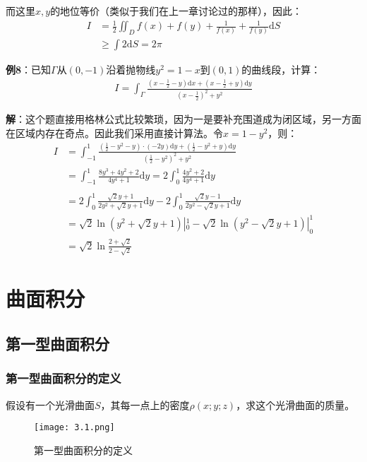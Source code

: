 \documentclass{ctexart}
\let\oldtextbf\textbf
\renewcommand{\textbf}[1]{\textcolor{brown!50!red}{\oldtextbf{#1}}}
\begin{document}
而这里$x,y$的地位等价（类似于我们在上一章讨论过的那样），因此：
\begin{align*}
    I&=\frac{1}{2}\iint_D f(x)+f(y)+\frac{1}{f(x)}+\frac{1}{f(y)}\mathrm{d}S\\
    &\geq \int 2\mathrm{d}S=2\pi
\end{align*}

\textbf{例8}：已知$\Gamma$从$(0,-1)$沿着抛物线$y^2=1-x$到$(0,1)$的曲线段，计算：
\begin{align*}
    I=\int_\Gamma \frac{(x-\frac{1}{2}-y)\mathrm{d}x+(x-\frac{1}{2}+y)\mathrm{d}y}{(x-\frac{1}{2})^2+y^2}
\end{align*}

\textbf{解}：这个题直接用格林公式比较繁琐，因为一是要补充围道成为闭区域，另一方面在区域内存在奇点。因此我们采用直接计算法。令$x=1-y^2$，则：
\begin{align*}
    I&=\int_{-1}^1\frac{(\frac{1}{2}-y^2-y)\cdot(-2y)\mathrm{d}y+(\frac{1}{2}-y^2+y)\mathrm{d}y}{(\frac{1}{2}
-y^2)^2+y^2 }\\
&=\int_{-1}^1 \frac{8y^3+4y^2+2}{4y^4+1}\mathrm{d}y=2\int_0^1\frac{4y^2+2}{4y^4+1}\mathrm{d}y\\
\\&=2\int_0^1\frac{\sqrt{2}y+1}{2y^2+\sqrt{2}y+1 }\mathrm{d}y -2
\int_0^1\frac{\sqrt{2}y-1}{2y^2-\sqrt{2}y+1 }\mathrm{d}y \\
&=\sqrt{2} \ln(y^2+\sqrt{2}y+1) |_0^1-\sqrt{2} \ln(y^2-\sqrt{2}y+1) |_0^1\\
&=\sqrt{2}\ln\frac{2+\sqrt{2}}{2-\sqrt{2}}
\end{align*}

\section{曲面积分}
\subsection{第一型曲面积分}
\subsubsection{第一型曲面积分的定义}
假设有一个光滑曲面$S$，其每一点上的密度$\rho(x;y;z)$，求这个光滑曲面的质量。

\begin{figure}[H]    
\centering     
\renewcommand{\figurename}{图}     
\renewcommand{\thefigure}{3.1}    
\begin{myimagebox}[width=0.45\textwidth] %
\texttt{[image: 3.1.png]} %
\end{myimagebox}     
\caption{\label{fig:3.1}第一型曲面积分的定义}   
\end{figure}
\end{document}

